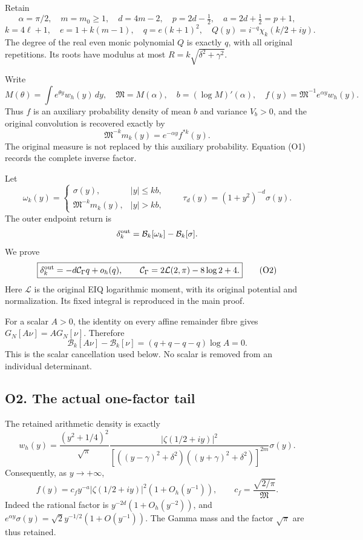 \documentclass[
  11pt,
]{article}
\begin{document}
Retain \[
\alpha=\pi/2,\quad m=m_0\ge1,\quad d=4m-2,\quad
p=2d-\tfrac12,\quad a=2d+\tfrac12=p+1,
\] \[
k=4\ell+1,\quad e=1+k(m-1),\quad q=e(k+1)^2,
\quad Q(y)=i^{-q}\chi_k(k/2+iy).
\] The degree of the real even monic polynomial \(Q\) is exactly \(q\),
with all original repetitions. Its roots have modulus at most
\(R=k\sqrt{\delta^2+\gamma^2}\).

Write \[
M(\theta)=\int e^{\theta y}w_h(y)\,dy,\quad
\mathfrak M=M(\alpha),\quad b=(\log M)'(\alpha),
\quad f(y)=\mathfrak M^{-1}e^{\alpha y}w_h(y).
\] Thus \(f\) is an auxiliary probability density of mean \(b\) and
variance \(V_b>0\), and the original convolution is recovered exactly by
\[
\boxed{\mathfrak M^{-k}m_k(y)=e^{-\alpha y}f^{*k}(y).}\tag{O1}
\] The original measure is not replaced by this auxiliary probability.
Equation (O1) records the complete inverse factor.

Let \[
\omega_k(y)=\begin{cases}\sigma(y),&|y|\le kb,\\
\mathfrak M^{-k}m_k(y),&|y|>kb,
\end{cases}
\qquad \tau_d(y)=(1+y^2)^{-d}\sigma(y).
\] The outer endpoint return is \[
\delta_k^{\rm out}=\mathcal B_k[\omega_k]-\mathcal B_k[\sigma].
\] We prove \[
\boxed{\delta_k^{\rm out}=-d\mathcal C_\Gamma q+o_h(q),
\qquad \mathcal C_\Gamma=2\mathcal L(2,\pi)-8\log2+4.}\tag{O2}
\] Here \(\mathcal L\) is the original EIQ logarithmic moment, with its
original potential and normalization. Its fixed integral is reproduced
in the main proof.

For a scalar \(A>0\), the identity on every affine remainder fibre gives
\(G_N[A\nu]=A G_N[\nu]\). Therefore \[
\mathcal B_k[A\nu]-\mathcal B_k[\nu]
=(q+q-q-q)\log A=0.\tag{O3}
\] This is the scalar cancellation used below. No scalar is removed from
an individual determinant.

\subsection{O2. The actual one-factor
tail}\label{o2.-the-actual-one-factor-tail}

The retained arithmetic density is exactly \[
w_h(y)=\frac{(y^2+1/4)^2}{\sqrt\pi}
\frac{|\zeta(1/2+iy)|^2}
{[((y-\gamma)^2+\delta^2)((y+\gamma)^2+\delta^2)]^{2m}}
\sigma(y).
\] Consequently, as \(y\to+\infty\), \[
\boxed{f(y)=c_f y^{-a}|\zeta(1/2+iy)|^2(1+O_h(y^{-1})),
\qquad c_f=\frac{\sqrt{2/\pi}}{\mathfrak M}.}\tag{O4}
\] Indeed the rational factor is \(y^{-2d}(1+O_h(y^{-2}))\), and
\(e^{\alpha y}\sigma(y)=\sqrt2 y^{-1/2}(1+O(y^{-1}))\). The Gamma mass
and the factor \(\sqrt\pi\) are thus retained.
\end{document}
